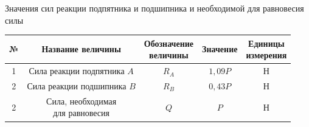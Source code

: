 \documentclass{article}
\begin{document}
\vspace*{-0.9cm}

\begin{center}
  Значения сил реакции подпятника и подшипника и необходимой для равновесия силы
\end{center}

\begin{tabular}{|c|c|c|c|c|}
  \hline
  \rule{0pt}{1cm} № & \hspace*{0.5cm} Название величины \hspace*{0.5cm} & \makecell{Обозначение\\ величины} & Значение & \makecell{Единицы\\ измерения} \\[0.5cm]
  \hline
  \rule{0pt}{1cm} 1  & \makecell{Сила реакции \\ подпятника $A$} & $R_A$ & $1,09P$ & Н \\[0.5cm]
  \hline
  \rule{0pt}{1cm} 2  & \makecell{Сила реакции \\ подшипника $B$} & $R_B$ & $0,43P$ & Н \\[0.5cm]
  \hline
  \rule{0pt}{1cm} 2  & \makecell{Сила, необходимая\\для равновесия} & $Q$ & $P$ & Н \\[0.5cm]
  \hline
\end{tabular}
\end{document}

